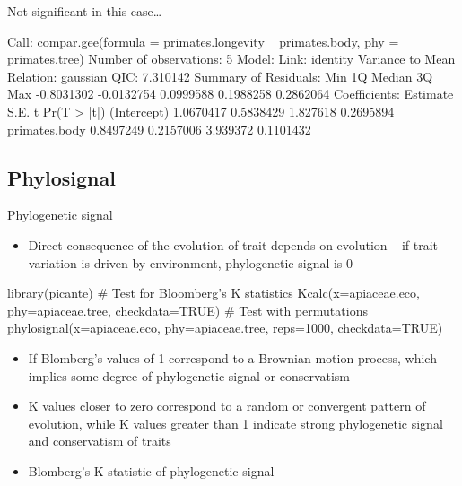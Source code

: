 \documentclass[compress, ucs, xelatex, 11pt, xcolor=svgnames,
  hyperref={
    bookmarks=true,
    unicode=true,
    colorlinks=true,
    pdftitle={Molecular data in R},
    plainpages=false,
    pdfauthor={Vojtech Zeisek},
    pdfsubject={Course about phylogeny and evolution in R},
    pdfcreator={XeLaTeX},
    pdfkeywords={R, evolution, phylogeny, molecular data},
    linkcolor=Tomato,
    anchorcolor=SaddleBrown,
    citecolor=Goldenrod,
    filecolor=DarkMagenta,
    menucolor=Sienna,
    urlcolor=DarkTurquoise,
    pdftex},
  url={hyphens, lowtilde} %
  ]{beamer}
\begin{document}
\begin{frame}[fragile]{Not significant in this case\ldots}
  \begin{spluscode}
    Call: compar.gee(formula = primates.longevity ~
      primates.body, phy = primates.tree)
    Number of observations:  5
    Model:
                         Link: identity
    Variance to Mean Relation: gaussian
    QIC: 7.310142
    Summary of Residuals:
           Min         1Q     Median         3Q        Max
    -0.8031302 -0.0132754  0.0999588  0.1988258  0.2862064
    Coefficients:
                   Estimate      S.E.        t Pr(T > |t|)
    (Intercept)   1.0670417 0.5838429 1.827618   0.2695894
    primates.body 0.8497249 0.2157006 3.939372   0.1101432
  \end{spluscode}
\end{frame}

%

\subsection{Phylosignal}

\begin{frame}[fragile]{Phylogenetic signal}
  \begin{itemize}
    \item Direct consequence of the evolution of trait depends on evolution -- if trait variation is driven by environment, phylogenetic signal is 0
  \end{itemize}
  \begin{spluscode}
    library(picante)
    # Test for Bloomberg's K statistics
    Kcalc(x=apiaceae.eco, phy=apiaceae.tree, checkdata=TRUE)
    # Test with permutations
    phylosignal(x=apiaceae.eco, phy=apiaceae.tree, reps=1000,
      checkdata=TRUE)
  \end{spluscode}
  \begin{itemize}
    \item If Blomberg's values of 1 correspond to a Brownian motion process, which implies some degree of phylogenetic signal or conservatism
    \item K values closer to zero correspond to a random or convergent pattern of evolution, while K values greater than 1 indicate strong phylogenetic signal and conservatism of traits
    \item Blomberg's K statistic of phylogenetic signal
  \end{itemize}
\end{frame}
\end{document}
